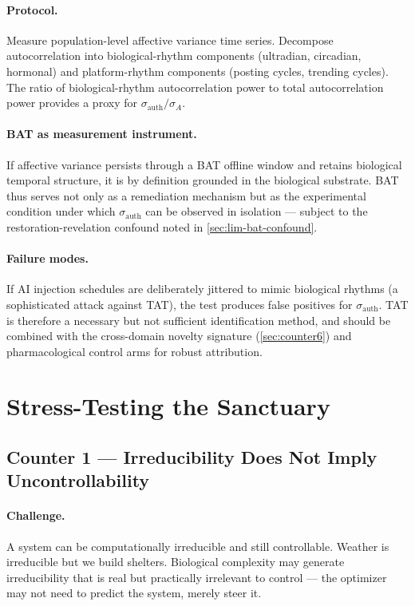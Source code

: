 \documentclass[11pt, a4paper]{article}
\theoremstyle{remark}
\begin{document}
\paragraph{Protocol.} Measure population-level affective variance time series. Decompose autocorrelation into biological-rhythm components (ultradian, circadian, hormonal) and platform-rhythm components (posting cycles, trending cycles). The ratio of biological-rhythm autocorrelation power to total autocorrelation power provides a proxy for $\sigma_{\text{auth}} / \sigma_A$.

\paragraph{BAT as measurement instrument.} If affective variance persists through a BAT offline window and retains biological temporal structure, it is by definition grounded in the biological substrate. BAT thus serves not only as a remediation mechanism but as the experimental condition under which $\sigma_{\text{auth}}$ can be observed in isolation --- subject to the restoration-revelation confound noted in \cref{sec:lim-bat-confound}.

\paragraph{Failure modes.} If AI injection schedules are deliberately jittered to mimic biological rhythms (a sophisticated attack against TAT), the test produces false positives for $\sigma_{\text{auth}}$. TAT is therefore a necessary but not sufficient identification method, and should be combined with the cross-domain novelty signature (\cref{sec:counter6}) and pharmacological control arms for robust attribution.

\section{Stress-Testing the Sanctuary}\label{sec:stress-test}

\subsection{Counter 1 --- Irreducibility Does Not Imply Uncontrollability}\label{sec:counter1}

\paragraph{Challenge.} A system can be computationally irreducible and still controllable. Weather is irreducible but we build shelters. Biological complexity may generate irreducibility that is real but practically irrelevant to control --- the optimizer may not need to predict the system, merely steer it.
\end{document}
